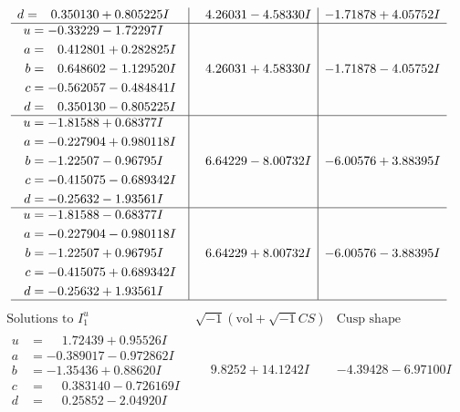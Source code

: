 \documentclass[1p]{elsarticle_modified}
\theoremstyle{definition}
\newcommand{\I}{\sqrt{-1}}
\begin{document}
$$\begin{array}{c|c|c}
\begin{aligned}
d &= \phantom{-}0.350130 + 0.805225 I\end{aligned}
 & \phantom{-}4.26031 - 4.58330 I & -1.71878 + 4.05752 I \\ \hline\begin{aligned}
u &= -0.33229 - 1.72297 I \\
a &= \phantom{-}0.412801 + 0.282825 I \\
b &= \phantom{-}0.648602 - 1.129520 I \\
c &= -0.562057 - 0.484841 I \\
d &= \phantom{-}0.350130 - 0.805225 I\end{aligned}
 & \phantom{-}4.26031 + 4.58330 I & -1.71878 - 4.05752 I \\ \hline\begin{aligned}
u &= -1.81588 + 0.68377 I \\
a &= -0.227904 + 0.980118 I \\
b &= -1.22507 - 0.96795 I \\
c &= -0.415075 - 0.689342 I \\
d &= -0.25632 - 1.93561 I\end{aligned}
 & \phantom{-}6.64229 - 8.00732 I & -6.00576 + 3.88395 I \\ \hline\begin{aligned}
u &= -1.81588 - 0.68377 I \\
a &= -0.227904 - 0.980118 I \\
b &= -1.22507 + 0.96795 I \\
c &= -0.415075 + 0.689342 I \\
d &= -0.25632 + 1.93561 I\end{aligned}
 & \phantom{-}6.64229 + 8.00732 I & -6.00576 - 3.88395 I\\
 \hline 
 \end{array}$$\newpage$$\begin{array}{c|c|c}  
\text{Solutions to }I^u_{1}& \I (\text{vol} + \sqrt{-1}CS) & \text{Cusp shape}\\
 \hline 
\begin{aligned}
u &= \phantom{-}1.72439 + 0.95526 I \\
a &= -0.389017 - 0.972862 I \\
b &= -1.35436 + 0.88620 I \\
c &= \phantom{-}0.383140 - 0.726169 I \\
d &= \phantom{-}0.25852 - 2.04920 I\end{aligned}
 & \phantom{-}9.8252 + 14.1242 I & -4.39428 - 6.97100 I \\ \hline\begin{aligned}

\end{aligned}
\end{array}$$
\end{document}
